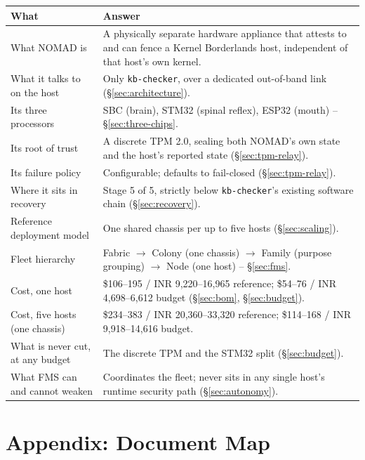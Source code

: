 \documentclass[11pt,a4paper]{article}
\begin{document}
\begin{center}
\renewcommand{\arraystretch}{1.35}
\small
\begin{longtable}{@{}p{3.6cm}p{9.8cm}@{}}
\toprule
\textbf{What} & \textbf{Answer} \\
\midrule
\endhead
What NOMAD is & A physically separate hardware appliance that attests to
and can fence a Kernel Borderlands host, independent of that host's own
kernel. \\
What it talks to on the host & Only \texttt{kb-checker}, over a
dedicated out-of-band link (\S\ref{sec:architecture}). \\
Its three processors & SBC (brain), STM32 (spinal reflex), ESP32
(mouth) -- \S\ref{sec:three-chips}. \\
Its root of trust & A discrete TPM 2.0, sealing both NOMAD's own state
and the host's reported state (\S\ref{sec:tpm-relay}). \\
Its failure policy & Configurable; defaults to fail-closed
(\S\ref{sec:tpm-relay}). \\
Where it sits in recovery & Stage 5 of 5, strictly below
\texttt{kb-checker}'s existing software chain (\S\ref{sec:recovery}). \\
Reference deployment model & One shared chassis per up to five hosts
(\S\ref{sec:scaling}). \\
Fleet hierarchy & Fabric $\to$ Colony (one chassis) $\to$ Family
(purpose grouping) $\to$ Node (one host) -- \S\ref{sec:fms}. \\
Cost, one host & \$106--195 / INR 9,220--16,965 reference; \$54--76 /
INR 4,698--6,612 budget (\S\ref{sec:bom}, \S\ref{sec:budget}). \\
Cost, five hosts (one chassis) & \$234--383 / INR 20,360--33,320
reference; \$114--168 / INR 9,918--14,616 budget. \\
What is never cut, at any budget & The discrete TPM and the STM32
split (\S\ref{sec:budget}). \\
What FMS can and cannot weaken & Coordinates the fleet; never sits in
any single host's runtime security path (\S\ref{sec:autonomy}). \\
\bottomrule
\end{longtable}
\end{center}

\section{Appendix: Document Map}
\end{document}
